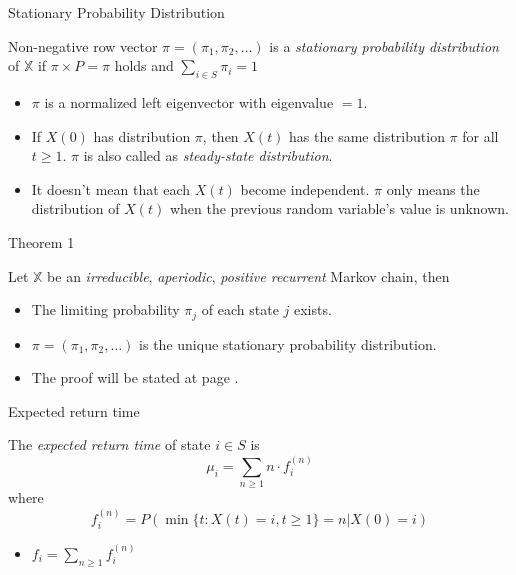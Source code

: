 \documentclass{beamer}
\begin{document}
\begin{frame}{Stationary Probability Distribution}
	\begin{definition}
		Non-negative row vector $\pi = (\pi_1, \pi_2, \ldots)$
		is a \textit{stationary probability distribution} of $\mathbb{X}$
		if $\pi \times P = \pi$ holds and $\sum_{i \in S} \pi_i = 1$
	\end{definition}
	\begin{itemize}
		\item $\pi$ is a normalized left eigenvector with eigenvalue $=1$.
		\item If $X(0)$ has distribution $\pi$, then $X(t)$ has the same distribution $\pi$
			for all $t \geq 1$.
			$\pi$ is also called as \textit{steady-state distribution}.
		\item It doesn't mean that each $X(t)$ become independent.
			$\pi$ only means the distribution of $X(t)$ when the previous random variable's value is unknown.
	\end{itemize}
\end{frame}

\begin{frame}{Theorem 1}
	\begin{theorem}
		Let $\mathbb{X}$ be an \textit{irreducible}, \textit{aperiodic}, \textit{positive recurrent} Markov chain, then
		\begin{itemize}
			\item The limiting probability $\pi_j$ of each state $j$ exists.
			\item $\pi = (\pi_1, \pi_2, \ldots)$ is the unique stationary probability distribution.
		\end{itemize}
	\end{theorem}
	\begin{itemize}
		\item The proof will be stated at page \hyperlink{thm1_proof}{\pageref{thm1_proof}}.
	\end{itemize}
\end{frame}

\begin{frame}{Expected return time}
	\begin{definition}
		The \textit{expected return time} of state $i \in S$ is
		\[
		\mu_i = \sum_{n \geq 1} n \cdot f_i^{(n)}
		\]
		where
		\[
		f_i^{(n)} = P(\min\{t:X(t) = i, t\geq 1\} = n | X(0) = i)
		\]
	\end{definition}
	\begin{itemize}
		\item $f_i = \sum_{n \geq 1} f_i^{(n)}$
	\end{itemize}
\end{frame}
\end{document}
